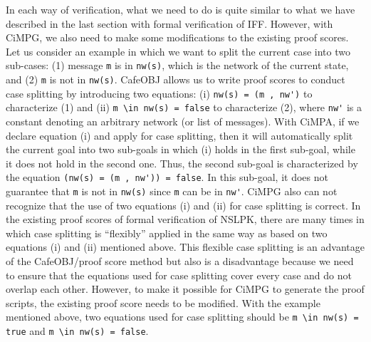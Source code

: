 \documentclass[10pt, conference, compsocconf]{IEEEtran}
\begin{document}
In each way of verification, what we need to do is quite similar to what we have described in the last section with formal verification of IFF. 
However, with CiMPG, we also need to make some modifications to the existing proof scores. 
Let us consider an example in which we want to split the current case into two sub-cases: (1) message \verb!m! is in \verb!nw(s)!, which is the network of the current state, and (2) \verb!m! is not in \verb!nw(s)!.
CafeOBJ allows us to write proof scores to conduct case splitting by introducing two equations: (i) \verb!nw(s) = (m , nw')! to characterize (1) and (ii) \verb!m \in nw(s) = false! to characterize (2), where \verb!nw'! is a constant denoting an arbitrary network (or list of messages).
With CiMPA, if we declare equation (i) and apply for case splitting, then it will automatically split the current goal into two sub-goals in which (i) holds in the first sub-goal, while it does not hold in the second one. Thus, the second sub-goal is characterized by the equation \verb!(nw(s) = (m , nw')) = false!. 
In this sub-goal, it does not guarantee that \verb!m! is not in \verb!nw(s)! since \verb!m! can be in \verb!nw'!.
CiMPG also can not recognize that the use of two equations (i) and (ii) for case splitting is correct.
In the existing proof scores of formal verification of NSLPK, there are many times in which case splitting is ``flexibly'' applied in the same way as based on two equations (i) and (ii) mentioned above.
This flexible case splitting is an advantage of the CafeOBJ/proof score method but also is a disadvantage because we need to ensure that the equations used for case splitting cover every case and do not overlap each other.
However, to make it possible for CiMPG to generate the proof scripts, the existing proof score needs to be modified.
With the example mentioned above, two equations used for case splitting should be \verb!m \in nw(s) = true! and \verb!m \in nw(s) = false!.


\end{document}
